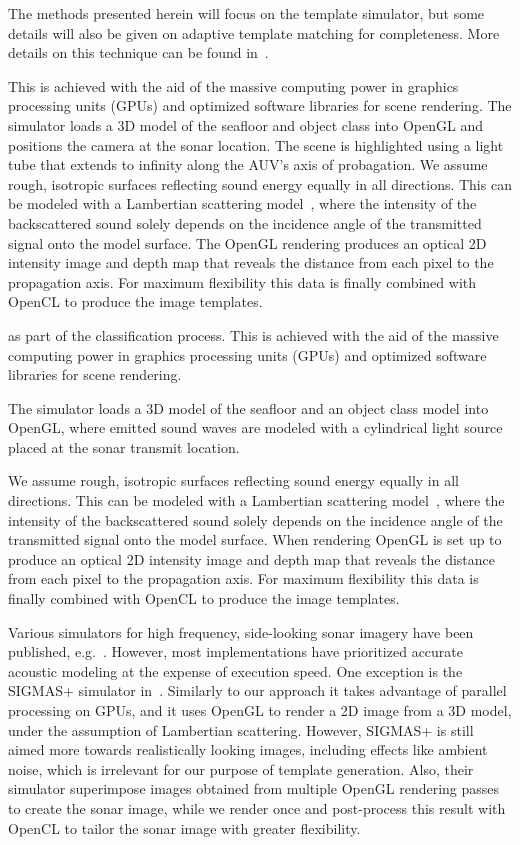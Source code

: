 The methods presented herein will focus on the template simulator, but some details will also be given on adaptive template matching for completeness. More details on this technique can be found in~\cite{Midelfart2010}.


 This is achieved with the aid of the massive computing power in graphics processing units (GPUs) and optimized software libraries for scene rendering. The simulator loads a 3D model of the seafloor and object class into OpenGL and positions the camera at the sonar location. The scene is highlighted using a light tube that extends to infinity along the AUV's axis of probagation. We assume rough, isotropic surfaces reflecting sound energy equally in all directions. This can be modeled with a Lambertian scattering model~\cite{Blake1993,Bell1995}, where the intensity of the backscattered sound solely depends on the incidence angle of the transmitted signal onto the model surface. The OpenGL rendering produces an optical 2D intensity image and depth map that reveals the distance from each pixel to the propagation axis. For maximum flexibility this data is finally combined with OpenCL to produce the image templates.

as part of the classification process. This is achieved with the aid of the massive computing power in graphics processing units (GPUs) and optimized software libraries for scene rendering.

The simulator loads a 3D model of the seafloor and an object class model into OpenGL, where emitted sound waves are modeled with a cylindrical light source placed at the sonar transmit location. 

We assume rough, isotropic surfaces reflecting sound energy equally in all directions. This can be modeled with a Lambertian scattering model~\cite{Blake1993,Bell1995}, where the intensity of the backscattered sound solely depends on the incidence angle of the transmitted signal onto the model surface. When rendering OpenGL is set up to produce an optical 2D intensity image and depth map that reveals the distance from each pixel to the propagation axis. For maximum flexibility this data is finally combined with OpenCL to produce the image templates.

Various simulators for high frequency, side-looking sonar imagery have been published, e.g.~\cite{Bell1997,Sammelm2003}. However, most implementations have prioritized accurate acoustic modeling at the expense of execution speed. One exception is the SIGMAS+ simulator in~\cite{Coiras2009a, Coiras2009b}. Similarly to our approach it takes advantage of parallel processing on GPUs, and it uses OpenGL to render a 2D image from a 3D model, under the assumption of Lambertian scattering. However, SIGMAS+ is still aimed more towards realistically looking images, including effects like ambient noise, which is irrelevant for our purpose of template generation. Also, their simulator superimpose images obtained from multiple OpenGL rendering passes to create the sonar image, while we render once and post-process this result with OpenCL to tailor the sonar image with greater flexibility.


